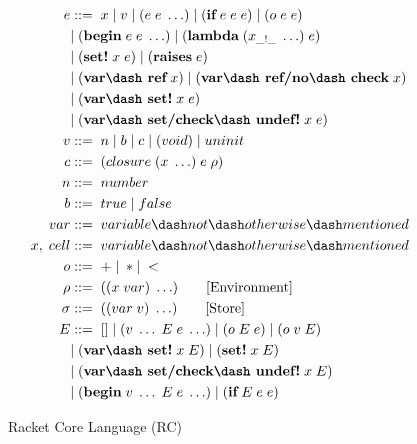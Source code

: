 \begin{wrapfigure}[24]{r}{0.45\textwidth}
  \vspace{-0.8cm}
  \footnotesize
  \begin{mdframed}
    \begin{align*}
      e &::=\; x\; |\; v\; |\; (e\; e\; \ldots)\; |\; (\textbf{if}\; e\; e\; e)\; |\; (o\; e\; e)\; \\
      \; &|\; (\textbf{begin}\; e\; e\; \ldots)\; |\; (\textbf{lambda}\; (x_{\_!\_}\; \ldots)\; e)\\
      \; &|\; (\textbf{set!}\; x\; e)\; |\; (\textbf{raises}\; e)\\
      \; &|\; (\textbf{var\dash ref}\; x)\; |\; (\textbf{var\dash ref/no\dash check}\; x) \\
      \; &|\; (\textbf{var\dash set!}\; x\; e)  \\
      \; &|\; (\textbf{var\dash set/check\dash undef!}\; x\; e) \\
      v   &::=\; n\; |\; b\; |\; c\; |\; (void)\;|\; uninit \\ %
      c   &::=\; (closure\; (x\; \ldots)\; e\; \rho) \\
      n   &::=\; number \\
      b   &::=\; true\; |\; false \\
      var &::=\; variable\dash not\dash otherwise\dash mentioned \\ %
      x,\; cell &::=\; variable\dash not\dash otherwise\dash mentioned \\ %
      o  &::=\; +\; |\; * |\; < \\
      \rho   &::=\; ((x\; var)\; \ldots) \tag*{[Environment]}\\
      \sigma   &::=\; ((var\; v)\; \ldots) \tag*{[Store]}\\
      E   &::=\; []\; |\; (v\; \ldots\; E\; e\; \ldots)\; |\; (o\; E\; e)\; |\; (o\; v\; E) \\
      \;  &|\; (\textbf{var\dash set!}\; x\; E)\; |\; (\textbf{set!}\; x\; E)\; \\
      \;  &|\; (\textbf{var\dash set/check\dash undef!}\; x\; E) \\
      \;  &|\; (\textbf{begin}\; v\; \ldots\; E\; e\; \ldots)\; |\; (\textbf{if}\; E\; e\; e)
    \end{align*}
    \caption{Racket Core Language (RC)}
    \label{fig:racket-source}
  \end{mdframed}
\end{wrapfigure}

